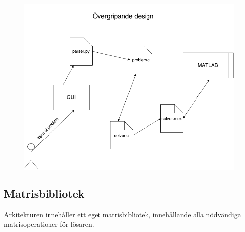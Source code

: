 \begin{figure}[H]
	\begin{center}
		\includegraphics[scale=0.5]{bilder/overgripande.png}
	\end{center}
\end{figure}

%



\subsection{Matrisbibliotek}
Arkitekturen innehåller ett eget matrisbibliotek, innehållande alla nödvändiga matrisoperationer för lösaren.

